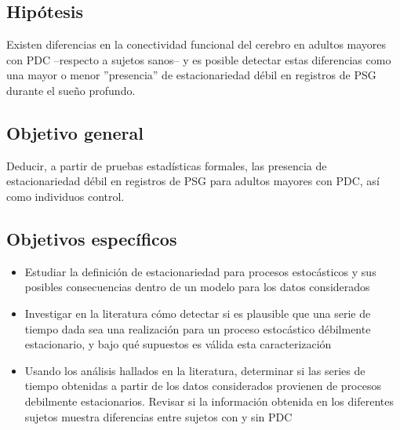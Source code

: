 \documentclass[12pt,a4paper]{mitthesis}
\begin{document}


\subsection{Hip\'otesis}

Existen diferencias en la conectividad funcional del cerebro en adultos mayores con PDC --respecto
a sujetos sanos-- y es posible detectar estas diferencias como una mayor o menor ''presencia'' de 
estacionariedad d\'ebil en registros de PSG durante el sue\~no profundo.


\subsection{Objetivo general}

Deducir, a partir de pruebas estad\'isticas formales, las presencia de estacionariedad d\'ebil en
registros de PSG para adultos mayores con PDC, as\'i como individuos control.


\subsection{Objetivos espec\'ificos}

\begin{itemize}
\item Estudiar la definici\'on de estacionariedad para procesos estoc\'asticos y sus posibles 
consecuencias dentro de un modelo para los datos considerados

\item Investigar en la literatura c\'omo detectar si es plausible que una serie de tiempo dada sea 
una realizaci\'on para un proceso estoc\'astico d\'ebilmente estacionario, y bajo qu\'e supuestos 
es v\'alida esta caracterizaci\'on

\item Usando los an\'alisis hallados en la literatura, determinar si las series de tiempo 
obtenidas a partir de los datos considerados provienen de procesos debilmente estacionarios.
Revisar si la informaci\'on obtenida en los diferentes sujetos muestra diferencias entre sujetos 
con y sin PDC
\end{itemize}
\end{document}
